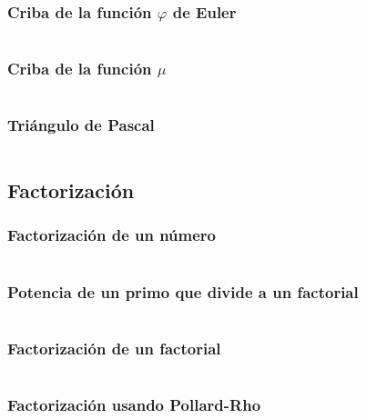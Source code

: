 \documentclass[11pt]{article}
\begin{document}
			\subsubsection{Criba de la función $\varphi$ de Euler}
			\inputminted[tabsize=2,breaklines,firstline=177,lastline=188,fontsize=\small]{c++}{numberTheory.cpp}
			
			\subsubsection{Criba de la función $\mu$}
			\inputminted[tabsize=2,breaklines,firstline=836,lastline=847,fontsize=\small]{c++}{numberTheory.cpp}
			
			\subsubsection{Triángulo de Pascal}
			\inputminted[tabsize=2,breaklines,firstline=190,lastline=201,fontsize=\small]{c++}{numberTheory.cpp}
		
		\subsection{Factorización}
			\subsubsection{Factorización de un número}
			\inputminted[tabsize=2,breaklines,firstline=203,lastline=216,fontsize=\small]{c++}{numberTheory.cpp}
			
			\subsubsection{Potencia de un primo que divide a un factorial}
			\inputminted[tabsize=2,breaklines,firstline=431,lastline=439,fontsize=\small]{c++}{numberTheory.cpp}
			
			\subsubsection{Factorización de un factorial}
			\inputminted[tabsize=2,breaklines,firstline=441,lastline=448,fontsize=\small]{c++}{numberTheory.cpp}
			
			\subsubsection{Factorización usando Pollard-Rho}
			\inputminted[tabsize=2,breaklines,firstline=688,lastline=740,fontsize=\small]{c++}{numberTheory.cpp}
		
\end{document}
